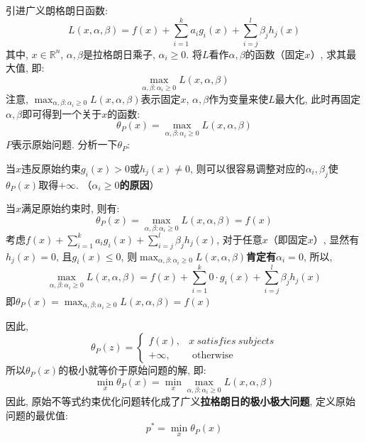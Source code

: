 引进广义朗格朗日函数: 
$$
L(x, \alpha, \beta) = f(x) + \sum_{i=1}^k a_i g_i(x) + \sum_{i=j}^l \beta_j h_j(x)
$$
其中, $x \in \mathbb{R}^n$, $\alpha, \beta$是拉格朗日乘子, $\alpha_i \geqslant 0$. 将$L$看作$\alpha, \beta$的函数（固定$x$）, 求其最大值, 即: 
$$
\mathop{max}_{\alpha, \beta:\alpha_i \geqslant 0} L(x, \alpha, \beta)
$$
注意, $\mathop{max}_{\alpha, \beta:\alpha_i \geqslant 0} L(x, \alpha, \beta)$表示固定$x$, $\alpha, \beta$作为变量来使$L$最大化, 此时再固定$\alpha, \beta$即可得到一个关于$x$的函数: 
$$
\theta_P (x) = \mathop{max}_{\alpha, \beta:\alpha_i \geqslant 0} L(x, \alpha, \beta)
$$
$P$表示原始问题. 分析一下$\theta_P$: 
\begin{myitemize}
	\item 当$x$违反原始约束$g_i(x) > 0$或$h_j(x) \neq 0$, 则可以很容易调整对应的$\alpha_i, \beta_j$使$\theta_P(x)$取得$+\infty$. （\textbf{$\alpha_i \geqslant 0$的原因}）
	\item 当$x$满足原始约束时, 则有: 
	$$
	\theta_P(x) = \mathop{max}_{\alpha, \beta:\alpha_i \geqslant 0} L(x, \alpha, \beta) = f(x)
	$$
	考虑$f(x) + \sum_{i=1}^k a_i g_i(x) + \sum_{i=j}^l \beta_j h_j(x)$, 对于任意$x$（即固定$x$）, 显然有$h_j(x) = 0$, 且$g_i(x) \leqslant 0$, 则$\mathop{max}_{\alpha, \beta:\alpha_i \geqslant 0} L(x, \alpha, \beta)$\textbf{肯定有$\alpha_i = 0$}, 所以, 
	$$
	\mathop{max}_{\alpha, \beta:\alpha_i \geqslant 0} L(x, \alpha, \beta) = f(x) + \sum_{i=1}^k 0 \cdot g_i(x) + \sum_{i=j}^l \beta_j h_j(x)
	$$
	即$\theta_P(x) = \mathop{max}_{\alpha, \beta:\alpha_i \geqslant 0} L(x, \alpha, \beta) = f(x)$
\end{myitemize}
因此, 
$$
\theta_P(z)= \begin{cases}f(x), & x\ satisfies\ subjects \\ +\infty, & \text { otherwise }\end{cases}
$$
所以$\theta_P(x)$的极小就等价于原始问题的解, 即: 
$$
\mathop{min}_{x} \theta_P(x) = \mathop{min}_{x} \mathop{max}_{\alpha, \beta: \alpha_i \geqslant 0} L(x, \alpha, \beta)
$$
因此, 原始不等式约束优化问题转化成了广义\textbf{拉格朗日的极小极大问题}, 定义原始问题的最优值: 
$$
p^* = \mathop{min}_{x} \theta_P(x)
$$

